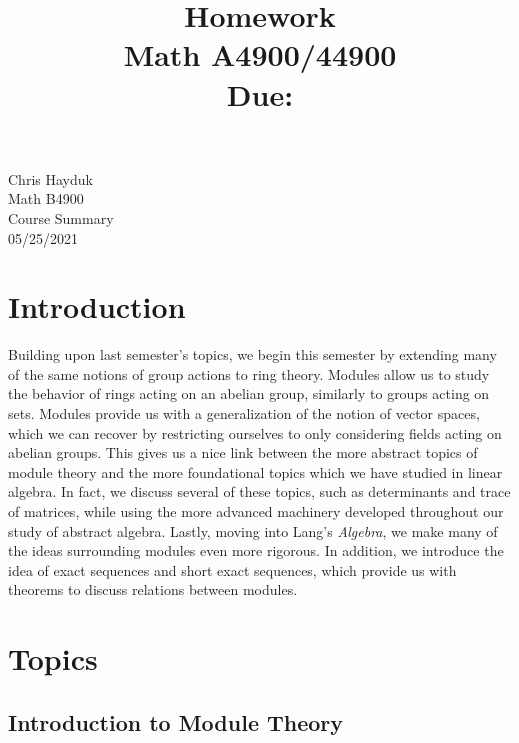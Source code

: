 \documentclass[11pt, reqno]{amsart}
\title[Homework \HW]{Homework \HW \\
Math A4900/44900\\
\small Due: \DUE}
\author{}
\theoremstyle{plain}
\theoremstyle{definition}
\theoremstyle{example}
\def\DUE{05/25/2021}
\begin{document}
\begin{flushright}
Chris Hayduk\\
Math B4900\\
Course Summary\\
\DUE
\end{flushright}

\section{Introduction}

Building upon last semester's topics, we begin this semester by extending many of the same notions of group actions to ring theory. Modules allow us to study the behavior of rings acting on an abelian group, similarly to groups acting on sets. Modules provide us with a generalization of the notion of vector spaces, which we can recover by restricting ourselves to only considering fields acting on abelian groups. This gives us a nice link between the more abstract topics of module theory and the more foundational topics which we have studied in linear algebra. In fact, we discuss several of these topics, such as determinants and trace of matrices, while using the more advanced machinery developed throughout our study of abstract algebra. Lastly, moving into Lang's \textit{Algebra}, we make many of the ideas surrounding modules even more rigorous. In addition, we introduce the idea of exact sequences and short exact sequences, which provide us with theorems to discuss relations between modules.


\section{Topics}

\subsection{Introduction to Module Theory}
\end{document}
